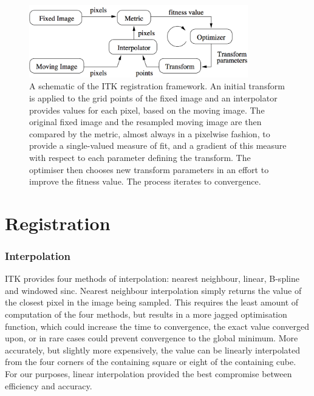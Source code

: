 \begin{figure}[htbp]
  \centering
  \includegraphics[width=0.85\textwidth]{Ch2/Figs/framework}
  \caption{A schematic of the ITK registration framework. An initial transform is applied to the grid points of the fixed image and an interpolator provides values for each pixel, based on the moving image. The original fixed image and the resampled moving image are then compared by the metric, almost always in a pixelwise fashion, to provide a single-valued measure of fit, and a gradient of this measure with respect to each parameter defining the transform. The optimiser then chooses new transform parameters in an effort to improve the fitness value. The process iterates to convergence.}
  \label{fig:framework}
\end{figure}

\section{Registration}
    \subsubsection{Interpolation} %
    \label{ssub:interpolation}
      ITK provides four methods of interpolation: nearest neighbour, linear, B-spline and windowed sinc. Nearest neighbour interpolation simply returns the value of the closest pixel in the image being sampled. This requires the least amount of computation of the four methods, but results in a more jagged optimisation function, which could increase the time to convergence, the exact value converged upon, or in rare cases could prevent convergence to the global minimum. More accurately, but slightly more expensively, the value can be linearly interpolated from the four corners of the containing square or eight of the containing cube.
			For our purposes, linear interpolation provided the best compromise between efficiency and accuracy.
    
